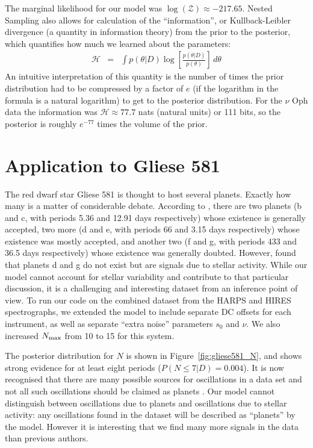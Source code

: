 \documentclass[useAMS,usenatbib]{mn2e}
\begin{document}
The marginal likelihood for our model was
$\log(\mathcal{Z}) \approx -217.65$. Nested Sampling also allows for calculation
of the ``information'', or Kullback-Leibler divergence (a quantity in information
theory) from the prior to the posterior, which quantifies how much we learned about the parameters:
\begin{eqnarray}
\mathcal{H} &=& \int p(\theta | D) \log\left[\frac{p(\theta | D)}{p(\theta)}\right] \, d\theta
\end{eqnarray}
An intuitive interpretation of this quantity is the number of times the
prior distribution had to be compressed by a factor of $e$ (if the logarithm
in the formula is a natural logarithm) to get to the posterior distribution.
For the $\nu$ Oph data the information was $\mathcal{H} \approx 77.7$ nats
(natural units) or 111 bits, so the posterior is roughly $e^{-77}$ times the
volume of the prior.

\section{Application to Gliese 581}
The red dwarf star Gliese 581 is thought to host several planets. Exactly
how many is a matter of considerable debate. According to
\citet{2014Sci...345..440R}, there are two planets
(b and c, with periods 5.36 and 12.91 days respectively)
whose existence is generally
accepted, two more
(d and e, with periods 66 and 3.15 days respectively)
whose existence was mostly accepted, and another two
(f and g, with periods 433 and 36.5 days respectively)
whose existence was generally doubted. However, \citet{2014Sci...345..440R}
found that planets d and g do not exist but are signals due to stellar activity.
While our model cannot account for stellar variability and contribute to that
particular discussion, it is a challenging and interesting dataset from an
inference point of view.
To run our code on the combined dataset from the HARPS and HIRES spectrographs,
we extended the model to include separate DC offsets for each instrument, as
well as separate ``extra noise'' parameters $s_0$ and $\nu$. We also increased
$N_{\rm max}$ from 10 to 15 for this system.

The posterior distribution for $N$ is shown in Figure~\ref{fig:gliese581_N},
and shows strong evidence for at least eight periods
($P(N \leq 7 | D) = 0.004$).
It is now recognised that
there are many possible sources for oscillations in a data set and not all
such oscillations should be claimed as planets \citep{2014Sci...345..440R}. 
Our model cannot distinguish between oscillations due to planets and
oscillations due to stellar activity: any oscillations found in the dataset
will be described as ``planets'' by the model. However it is interesting that
we find many more signals in the data than previous authors.
\end{document}
